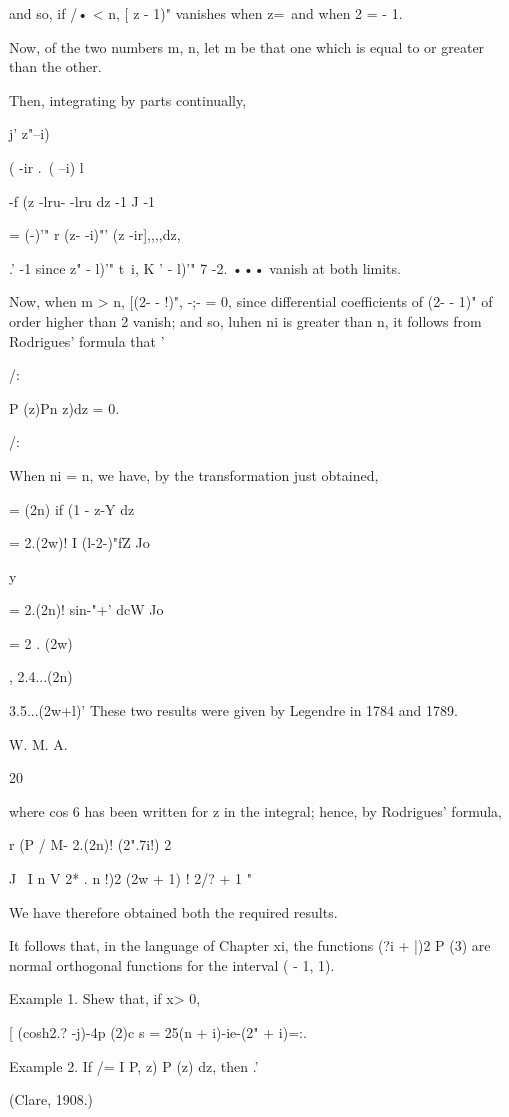 {and so, if /• < n, [ z - 1)" vanishes when z=\ and when 2 = - 1.

Now, of the two numbers m, n, let m be that one which is equal to or
greater than the other.

Then, integrating by parts continually,

j' z"--i)%

 ( -ir .\, ( --i) l

-f (z -lru- -lru dz -1 J -1

= (-)'" r (z- -i)"' (z -ir],,,,dz,

.' -1 since z" - l)'" t\ i, K ' - l)'" 7 -2. ••• vanish at both
limits.

Now, when m > n, [(2- - !)", -;- = 0, since differential coefficients
of (2- - 1)" of order higher than 2 vanish; and so, luhen ni is
greater than n, it follows from Rodrigues' formula that '

/:

P (z)Pn z)dz = 0.

/:

When ni = n, we have, by the transformation just obtained,

= (2n) if (1 - z-Y dz

= 2.(2w)! I (l-2-)"fZ Jo

y

= 2.(2n)! sin-"+' dcW Jo

= 2 . (2w)

, 2.4...(2n)

3.5...(2w+l)' These two results were given by Legendre in 1784 and
1789.

W. M. A.

20

%
%

where cos 6 has been written for z in the integral; hence, by
Rodrigues' formula,

r (P / M- 2.(2n)! (2".7i!) 2

J \ I n V 2* . n !)2 (2w + 1) ! 2/? + 1 "

We have therefore obtained both the required results.

It follows that, in the language of Chapter xi, the functions (?i +
|)2 P (3) are normal orthogonal functions for the interval ( - 1, 1).

Example 1. Shew that, if x> 0,

[ (cosh2.? -j)-4p (2)c s = 25(n + i)-ie-(2" + i)=:.

Example 2. If /= I P, z) P (z) dz, then .'

(Clare, 1908.)

}
